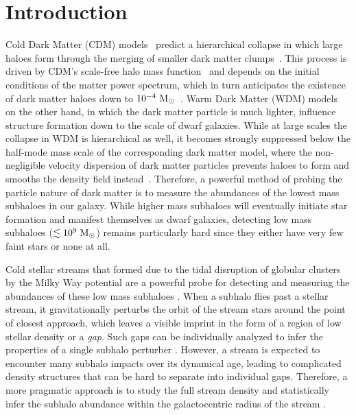 \documentclass[fleqn,usenatbib]{mnras}
\begin{document}
\section{Introduction}
\label{sec:intro}
Cold Dark Matter (CDM) models~\citep{1982ApJ...263L...1P,1984Natur.311..517B} predict
a hierarchical collapse in which large haloes form through the merging of smaller dark matter clumps~\citep{moore1999dark,avila1998formation,zhao2003growth}.
This process is driven by CDM's scale-free halo mass function~\citep{hofmann2001damping,schneider2013halo} and depends 
on the initial conditions of the matter power spectrum, which in turn 
anticipates the existence of 
dark matter haloes down to $10^{-4}~\textrm{M}_\odot$~\citep{bertschinger2006effects}.
Warm Dark Matter (WDM) models~\citep{bond1983collisionless,dodelson1994sterile,2001ApJ...556...93B} on the other hand, in which the dark matter particle is much lighter, influence
structure formation down to the scale of dwarf galaxies. While at large scales the collapse in WDM is hierarchical as well, it becomes strongly suppressed
below the half-mode mass scale of the corresponding dark matter model, where the non-negligible velocity dispersion of dark matter particles prevents haloes to form and smooths the density field instead~\citep{smith2011testing}. Therefore, a powerful method of probing the particle nature of dark matter is to measure the abundances of the lowest mass subhaloes in our galaxy.
While higher mass subhaloes will eventually initiate star formation and manifest themselves as dwarf galaxies, detecting low mass subhaloes ($\lesssim 10^9 ~\textrm{M}_\odot$) remains particularly hard since they either have very few faint stars or none at all.

\medskip

Cold stellar streams that formed due to the tidal disruption of globular clusters by the Milky Way potential are a powerful probe for detecting and measuring the abundances of these low mass subhaloes  \citep{ibata2002uncovering,johnston2002lumpy,yoon2011clumpy,carlberg2012dark,Erkal2015,Erkal2015a}. 
When a subhalo flies past a stellar stream, it gravitationally perturbs the orbit of the stream stars around the point of closest approach, which leaves a visible imprint in the form of a region of low stellar density or a \emph{gap}. Such gaps can be individually analyzed to infer the properties of a single subhalo perturber \citep{Erkal2015a}. However, a stream is expected to encounter many subhalo impacts over its dynamical age, leading to complicated density structures that can be hard to separate into individual gaps. Therefore, a more pragmatic approach is to study the full stream density and statistically infer the subhalo abundance within the galactocentric radius of the stream \citep{Bovy2016a}.
\end{document}
